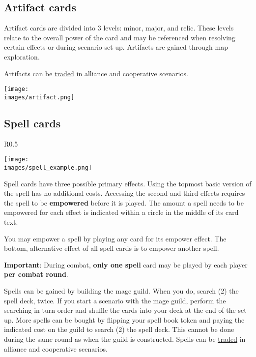 \documentclass[12pt]{article}
\def\assets{assets}
\def\images{\assets/images}
\def\svgs{\assets/svgs}
\begin{document}
\subsection*{Artifact cards}
Artifact cards are divided into 3 levels: minor, major, and relic. These levels relate to the overall power of the card and may be referenced when resolving certain effects or during scenario set up. Artifacts are gained through map exploration.\par
Artifacts can be \hyperlink{Trading}{traded} in alliance and cooperative scenarios.\par
\texttt{[image: \\images/artifact.png]}

\clearpage

\subsection*{\hypertarget{spells}{Spell cards}}
\begin{wrapfigure}{R}{0.5\textwidth}
    \begin{center}
    \texttt{[image: \\images/spell\_example.png]}
    \end{center}
\end{wrapfigure}

Spell cards have three possible primary effects. Using the topmost basic version of the spell has no additional costs. Accessing the second and third effects requires the spell to be \textbf{empowered} before it is played. The amount a spell needs to be empowered for each effect is indicated within a circle in the middle of its card text.\par
You may empower a spell by playing any card for its empower  effect. The bottom, alternative effect of all spell cards is to empower another spell.\par
\textbf{Important}: During combat, \textbf{only one spell} card may be played by each player \textbf{per combat round}.\par
Spells can be gained by building the mage guild. When you do, search (2) the spell deck, twice. If you start a scenario with the mage guild, perform the searching in turn order and shuffle the cards into your deck at the end of the set up. More spells can be bought by flipping your spell book token and paying the indicated cost on the guild to search (2) the spell deck. This cannot be done during the same round as when the guild is constructed. Spells can be \hyperlink{Trading}{traded} in alliance and cooperative scenarios.
\end{document}
